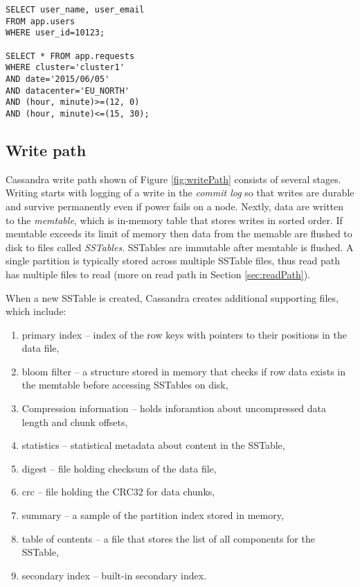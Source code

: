 \begin{lstlisting}[style=outcode,label={lst:cqlSelect},caption={Examples of CQL select statements}]
SELECT user_name, user_email 
FROM app.users 
WHERE user_id=10123;
    
SELECT * FROM app.requests
WHERE cluster='cluster1'
AND date='2015/06/05'
AND datacenter='EU_NORTH'
AND (hour, minute)>=(12, 0) 
AND (hour, minute)<=(15, 30);
\end{lstlisting}


\subsection{Write path}
Cassandra write path \cite{CassandraWritePath} shown of Figure \ref{fig:writePath} consists of several stages. Writing starts with logging of a write in the \emph{commit log} so that writes are durable and survive permanently even if power fails on a node. 
Nextly, data are written to the \emph{memtable}, which is in-memory table that stores writes in sorted order.
If memtable exceeds its limit of memory then data from the memable are flushed to disk to files called \emph{SSTables}. SSTables are immutable after memtable is flushed. A single partition is typically stored across multiple SSTable files, thus read path has multiple files to read (more on read path in Section \ref{sec:readPath}).

When a new SSTable is created, Cassandra creates additional supporting files, which include: \begin{enumerate}
\item primary index -- index of the row keys with pointers to their positions in the data file,
\item bloom filter -- a structure stored in memory that checks if row data exists in the memtable before accessing SSTables on disk,
\item Compression information -- holds inforamtion about uncompressed data length and chunk offsets,
\item statistics -- statistical metadata about content in the SSTable,
\item digest -- file holding checksum of the data file,
\item crc -- file holding the CRC32 for data chunks,
\item summary -- a sample of the partition index stored in memory,
\item table of contents -- a file that stores the list of all components for the SSTable,
\item secondary index -- built-in secondary index.
\end{enumerate}

